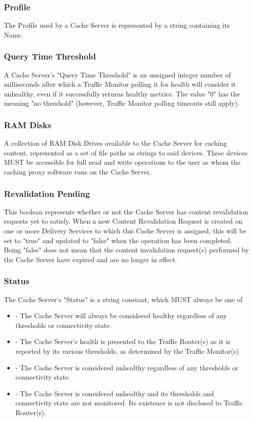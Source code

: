 \subsubsection{Profile}
The Profile used by a Cache Server is represented by a string containing its
Name.

\subsubsection{Query Time Threshold}
A Cache Server's "Query Time Threshold" is an unsigned integer number of
milliseconds after which a Traffic Monitor polling it for health will consider
it unhealthy, even if it successfully returns healthy metrics. The value "0" has
the meaning "no threshold" (however, Traffic Monitor polling timeouts still
apply).

\subsubsection{RAM Disks}
A collection of RAM Disk Drives available to the Cache Server for caching
content, represented as a set of file paths as strings to said devices. These
devices MUST be accessible for full read and write operations to the user as
whom the caching proxy software runs on the Cache Server.

\subsubsection{Revalidation Pending}
This boolean represents whether or not the Cache Server has content revalidation
requests yet to satisfy. When a new Content Revalidation Request is created on
one or more Delivery Services to which this Cache Server is assigned, this will
be set to "true" and updated to "false" when the operation has been completed.
Being "false" does not mean that the content invalidation request(s) performed
by the Cache Server have expired and are no longer in effect.

\subsubsection{Status}
The Cache Server's "Status" is a string constant, which MUST always be one of

\begin{itemize}
	\item {} - The Cache Server will always be considered healthy
	regardless of any thresholds or connectivity state.
	\item {} - The Cache Server's health is presented to the
	Traffic Router(s) as it is reported by its various thresholds, as determined
	by the Traffic Monitor(s).
	\item {} - The Cache Server is considered unhealthy regardless
	of any thresholds or connectivity state.
	\item {} - The Cache Server is considered unhealthy and its
	thresholds and connectivity state are not monitored. Its existence is not
	disclosed to Traffic Router(s).
\end{itemize}

